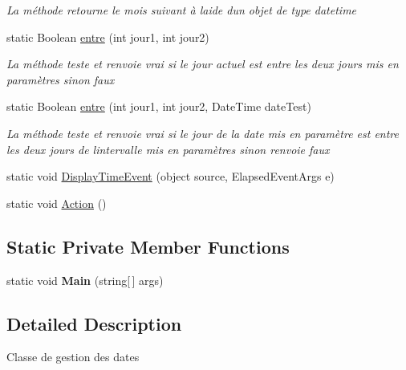 \begin{DoxyCompactItemize}
\begin{DoxyCompactList}\small\item\em La méthode retourne le mois suivant à l\textquotesingle{}aide d\textquotesingle{}un objet de type datetime \end{DoxyCompactList}\item 
static Boolean \mbox{\hyperlink{class_console_app8_1_1gestion_date_afa35b030b6e2aab20ffd13b0fc7b10b3}{entre}} (int jour1, int jour2)
\begin{DoxyCompactList}\small\item\em La méthode teste et renvoie vrai si le jour actuel est entre les deux jours mis en paramètres sinon faux ~\newline
\end{DoxyCompactList}\item 
static Boolean \mbox{\hyperlink{class_console_app8_1_1gestion_date_a9fc9223a86a8ceda232234d99e92a01f}{entre}} (int jour1, int jour2, Date\+Time date\+Test)
\begin{DoxyCompactList}\small\item\em La méthode teste et renvoie vrai si le jour de la date mis en paramètre est entre les deux jours de l\textquotesingle{}intervalle mis en paramètres sinon renvoie faux ~\newline
\end{DoxyCompactList}\item 
static void \mbox{\hyperlink{class_console_app8_1_1gestion_date_add2c0b76c8380ff81b55fb4c8e2949ec}{Display\+Time\+Event}} (object source, Elapsed\+Event\+Args e)
\item 
static void \mbox{\hyperlink{class_console_app8_1_1gestion_date_aba8ed79a00d7ee8bbb7af0b0be68a2ca}{Action}} ()
\end{DoxyCompactItemize}
\subsection*{Static Private Member Functions}
\begin{DoxyCompactItemize}
\item 
\mbox{\label{class_console_app8_1_1gestion_date_ac863a3e020b4153508a1522e12bef480}} 
static void {\bfseries Main} (string\mbox{[}$\,$\mbox{]} args)
\end{DoxyCompactItemize}


\subsection{Detailed Description}
Classe de gestion des dates 



